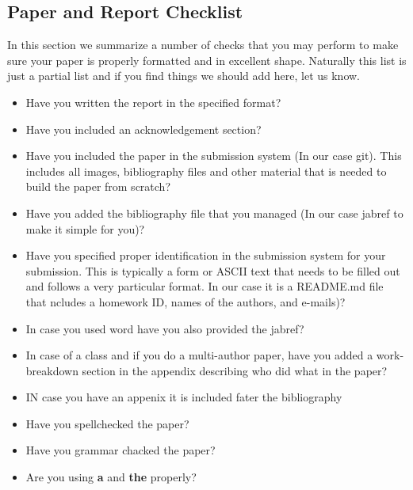 \subsection{Paper and Report Checklist}\label{paper-checklist}

In this section we summarize a number of checks that you may perform to
make sure your paper is properly formatted and in excellent shape.
Naturally this list is just a partial list and if you find things we
should add here, let us know.

\begin{itemize}[label=$\Box$]

\item Have you written the report in the specified format?

\item Have you included an acknowledgement section?

\item Have you included the paper in the submission system (In our
  case git). This includes all images, bibliography files and other
  material that is needed to build the paper from scratch?

\item Have you added the bibliography file that you managed (In our
  case jabref to make it simple for you)?

\item Have you specified proper identification in the submission
  system for your submission.  This is typically a form or ASCII text
  that needs to be filled out and follows a very particular format.
  In our case it is a README.md file that ncludes a homework ID, names
  of the authors, and e-mails)?

\item In case you used word have you also provided the jabref?

\item In case of a class and if you do a multi-author paper, have you
  added a work-breakdown section in the appendix describing who did
  what in the paper?

\item IN case you have an appenix it is included fater the bibliography

\item Have you spellchecked the paper?

\item Have you grammar chacked the paper?

\item Are you using \textbf{a} and \textbf{the} properly?


\end{itemize}
